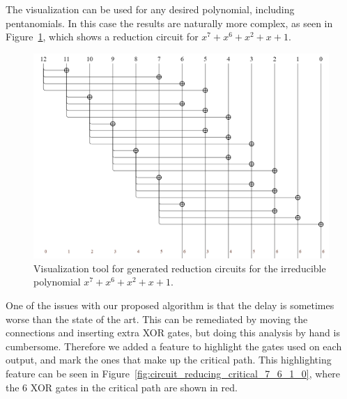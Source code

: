 The visualization can be used for any desired polynomial, including pentanomials. In this case the results are naturally more complex, as seen in Figure~\ref{fig:circuit_reducing_7_6_1_0}, which shows a reduction circuit for $x^7 + x^6 + x^2 + x + 1$.

\begin{figure}
  \caption{Visualization tool for generated reduction circuits for the irreducible polynomial $x^7 + x^6 + x^2 + x + 1$.}
  \label{fig:circuit_reducing_7_6_1_0}
  \centering
  \includegraphics[width = 1\columnwidth]{figures/reducing-7-6-2-1-0.png}
\end{figure}

One of the issues with our proposed algorithm is that the delay is sometimes worse than the state of the art. This can be remediated by moving the connections and inserting extra XOR gates, but doing this analysis by hand is cumbersome. Therefore we added a feature to highlight the gates used on each output, and mark the ones that make up the critical path. This highlighting feature can be seen in Figure~\ref{fig:circuit_reducing_critical_7_6_1_0}, where the 6 XOR gates in the critical path are shown in red. \\

